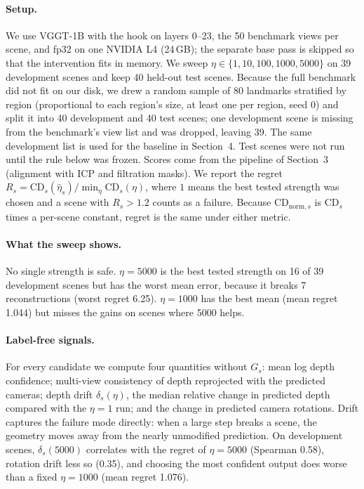 \documentclass[sigconf,nonacm]{acmart}
\begin{document}
\paragraph{Setup.} We use VGGT-1B with the hook on layers 0--23, the 50 benchmark views per scene, and fp32 on one NVIDIA L4 (24\,GB); the separate base pass is skipped so that the intervention fits in memory. We sweep $\eta\in\{1,10,100,1000,5000\}$ on 39 development scenes and keep 40 held-out test scenes. Because the full benchmark did not fit on our disk, we drew a random sample of 80 landmarks stratified by region (proportional to each region's size, at least one per region, seed 0) and split it into 40 development and 40 test scenes; one development scene is missing from the benchmark's view list and was dropped, leaving 39. The same development list is used for the baseline in Section~4. Test scenes were not run until the rule below was frozen. Scores come from the pipeline of Section~3 (alignment with ICP and filtration masks). We report the regret $R_s=\mathrm{CD}_s(\hat\eta_s)/\min_{\eta}\mathrm{CD}_s(\eta)$, where $1$ means the best tested strength was chosen and a scene with $R_s>1.2$ counts as a failure. Because $\mathrm{CD}_{\mathrm{norm},s}$ is $\mathrm{CD}_s$ times a per-scene constant, regret is the same under either metric.

\paragraph{What the sweep shows.} No single strength is safe. $\eta=5000$ is the best tested strength on 16 of 39 development scenes but has the worst mean error, because it breaks 7 reconstructions (worst regret 6.25). $\eta=1000$ has the best mean (mean regret 1.044) but misses the gains on scenes where 5000 helps.

\paragraph{Label-free signals.} For every candidate we compute four quantities without $G_s$: mean log depth confidence; multi-view consistency of depth reprojected with the predicted cameras; depth drift $\delta_s(\eta)$, the median relative change in predicted depth compared with the $\eta=1$ run; and the change in predicted camera rotations. Drift captures the failure mode directly: when a large step breaks a scene, the geometry moves away from the nearly unmodified prediction. On development scenes, $\delta_s(5000)$ correlates with the regret of $\eta=5000$ (Spearman 0.58), rotation drift less so (0.35), and choosing the most confident output does worse than a fixed $\eta=1000$ (mean regret 1.076).
\end{document}
